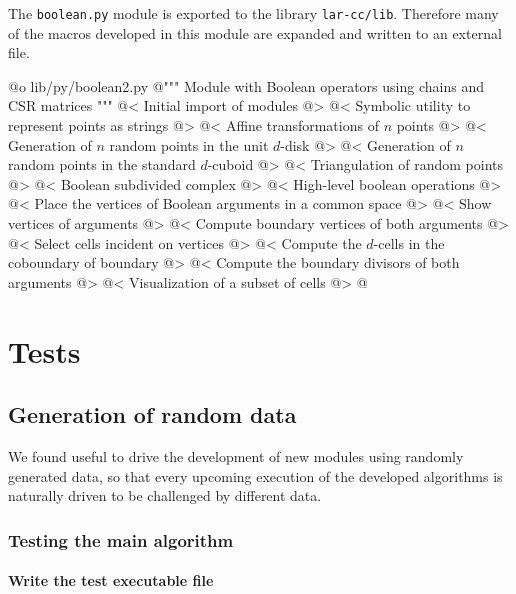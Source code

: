 \documentclass[11pt,oneside]{article}	%
\begin{document}
The \texttt{boolean.py} module is exported to the library \texttt{lar-cc/lib}. Therefore many of the macros developed in this module are expanded and written to an external file.

@o lib/py/boolean2.py
@{""" Module with Boolean operators using chains and CSR matrices """
@< Initial import of modules @>
@< Symbolic utility to represent points as strings @>
@< Affine transformations of $n$ points @>
@< Generation of $n$ random points in the unit $d$-disk @>
@< Generation of $n$ random points in the standard $d$-cuboid @>
@< Triangulation of random points @>
@< Boolean subdivided complex @>
@< High-level boolean operations @>
@< Place the vertices of Boolean arguments in a common space @>
@< Show vertices of arguments @>
@< Compute boundary vertices of both arguments @>
@< Select cells incident on vertices @>
@< Compute the $d$-cells in the coboundary of boundary @>
@< Compute the boundary divisors of both arguments @>
@< Visualization of a subset of cells @>
@}

\section{Tests}
\subsection{Generation of random data}

We found useful to drive the development of new modules using randomly generated data, so that every upcoming execution of the developed algorithms is naturally driven to be challenged by different data.

\subsubsection{Testing the main algorithm}

\paragraph{Write the test executable file}
\end{document}
